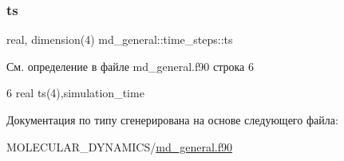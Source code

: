 \subsubsection{\texorpdfstring{ts}{ts}}
{\footnotesize\ttfamily real, dimension(4) md\+\_\+general\+::time\+\_\+steps\+::ts}



См. определение в файле md\+\_\+general.\+f90 строка 6


\begin{DoxyCode}
6     real    ts(4),simulation\_time
\end{DoxyCode}


Документация по типу сгенерирована на основе следующего файла\+:\begin{DoxyCompactItemize}
\item 
M\+O\+L\+E\+C\+U\+L\+A\+R\+\_\+\+D\+Y\+N\+A\+M\+I\+C\+S/\mbox{\hyperlink{md__general_8f90}{md\+\_\+general.\+f90}}\end{DoxyCompactItemize}
